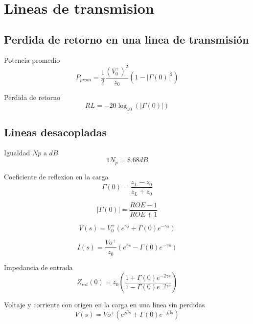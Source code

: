 \documentclass[12pt,letterpaper]{article}
\begin{document}
\newpage
\section{Lineas de transmision}

\subsection{Perdida de retorno en una linea de transmisión}

Potencia promedio
\begin{equation}
    P_{prom}=\frac{1}{2}\frac{(V_{0}^{+})^{2}}{z_0}(1-|\Gamma(0)|^{2})
\end{equation}

Perdida de retorno
\begin{equation}
    RL=-20\log_{10}(|\Gamma(0)|)
\end{equation}

\subsection{Lineas desacopladas}

Igualdad $Np$ a $dB$
\begin{equation}
    1 N_p=8.68 dB
\end{equation}

Coeficiente de reflexion en la carga
\begin{equation}
    \Gamma(0)=\frac{z_L-z_0}{z_L+z_0}
\end{equation}

\begin{equation}
    |\Gamma(0)|=\frac{ROE-1}{ROE+1}
\end{equation}

\begin{equation}
    V(s)=V_{0}^{+}(e^{\gamma s}+\Gamma(0)e^{-\gamma s})
\end{equation}

\begin{equation}
    I(s)=\frac{Vo^{+}}{z_0}(e^{\gamma s}-\Gamma(0)e^{-\gamma s})
\end{equation}

Impedancia de entrada
\begin{equation}
    Z_{int}(0)=z_0(\frac{1+\Gamma(0)e^{-2 \gamma s}}{1-\Gamma(0)e^{-2 \gamma s}})
\end{equation}

Voltaje y corriente con origen en la carga en una linea sin perdidas
\begin{equation}
    V(s)=Vo^{+}(e^{j \beta s}+\Gamma(0)e^{-j \beta s})
\end{equation}
\end{document}
